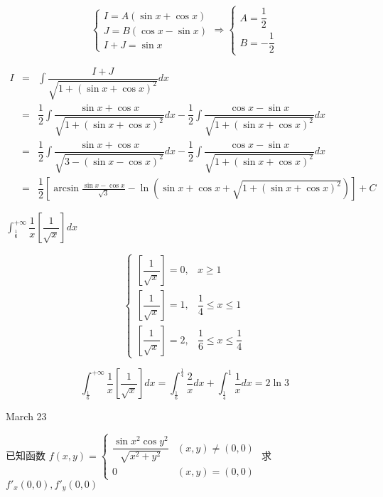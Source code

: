 \begin{solution}
	
	$$\begin{cases}
	  I = A(\sin x +\cos x)\\
	  J = B(\cos x -\sin x)\\
	  I + J = \sin x
	\end{cases}\Rightarrow 
	\begin{cases}
		A = \dfrac{1}{2}\\
		B = -\dfrac{1}{2}
	\end{cases}$$
	
	\begin{eqnarray*}
		I & = & \int\dfrac{I+J}{\sqrt{1+(\sin x+\cos x)^2}}dx\\
		  & = & \dfrac{1}{2}\int\dfrac{\sin x+\cos x}{\sqrt{1+(\sin x+\cos x)^2}}dx - \dfrac{1}{2}\int\dfrac{\cos x-\sin x}{\sqrt{1+(\sin x+\cos x)^2}}dx\\
		  & = & \dfrac{1}{2}\int\dfrac{\sin x+\cos x}{\sqrt{3-(\sin x-\cos x)^2}}dx - \dfrac{1}{2}\int\dfrac{\cos x-\sin x}{\sqrt{1+(\sin x+\cos x)^2}}dx\\
		  & = & \dfrac{1}{2}\left[ \arcsin \frac{\sin x-\cos x}{\sqrt{3}}-\ln\left(\sin x+\cos x+\sqrt{1+(\sin x+\cos x)^2} \right)\right] +C
	\end{eqnarray*}
\end{solution}

\begin{example}[][Exam: 29.4.2]
	$\int_{\frac{1}{6}}^{+\infty}\dfrac{1}{x}\left[ \dfrac{1}{\sqrt{x}}\right]dx$
\end{example}

\begin{solution}
	
	$$\begin{cases}
		\left[ \dfrac{1}{\sqrt{x}}\right]=0, &x\geq 1\\
		\left[ \dfrac{1}{\sqrt{x}}\right]=1, &\dfrac{1}{4}\leq x\leq 1\\
		\left[ \dfrac{1}{\sqrt{x}}\right]=2, &\dfrac{1}{6}\leq x\leq \dfrac{1}{4}
	\end{cases}$$
	
	$$\int_{\frac{1}{6}}^{+\infty}\dfrac{1}{x}\left[ \dfrac{1}{\sqrt{x}}\right]dx = 
	\int_{\frac{1}{6}}^{\frac{1}{4}}\dfrac{2}{x}dx+\int_{\frac{1}{4}}^{1}\dfrac{1}{x}dx=2\ln 3$$
\end{solution}

\textcolor{purplea}{March 23}

\begin{example}[][Exam: 29.4.3]
	已知函数 $f(x,y)=
\begin{cases}
	\dfrac{\sin x^2\cos y^2}{\sqrt{x^2+y^2}} & (x,y)\neq (0,0)\\
	0  & (x,y)=(0,0)
\end{cases}$ 求 $f'_{x}(0,0),f'_{y}(0,0)$
\end{example}

